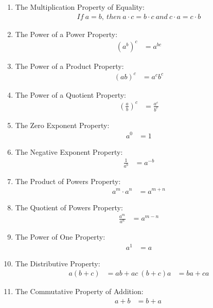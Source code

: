 \documentclass{article}
\begin{document}
\begin{enumerate}
\item The Multiplication Property of Equality:
\begin{align*}
If\ a = b,\ then\ a \cdot c = b \cdot c\ and\ c \cdot a = c \cdot b
\end{align*}

\item The Power of a Power Property:
\begin{align*}
(a^b)^c &= a^{bc}
\end{align*}

\item The Power of a Product Property:
\begin{align*}
(ab)^c &= a^c b^c
\end{align*}

\item The Power of a Quotient Property:
\begin{align*}
\left(\frac{a}{b}\right)^c &= \frac{a^c}{b^c}
\end{align*}

\item The Zero Exponent Property:
\begin{align*}
a^0 &= 1
\end{align*}

\item The Negative Exponent Property:
\begin{align*}
\frac{1}{a^b} &= a^{-b}
\end{align*}

\item The Product of Powers Property:
\begin{align*}
a^{m} \cdot a^{n} &= a^{m+n}
\end{align*}

\item The Quotient of Powers Property:
\begin{align*}
\frac{a^{m}}{a^{n}} &= a^{m-n}
\end{align*}

\item The Power of One Property:
\begin{align*}
a^{1} &= a
\end{align*}

\item The Distributive Property:
\begin{align*}
a(b+c) &= ab + ac \
(b+c)a &= ba + ca
\end{align*}

\item The Commutative Property of Addition:
\begin{align*}
a + b &= b + a \
\end{align*}


\end{enumerate}
\end{document}

